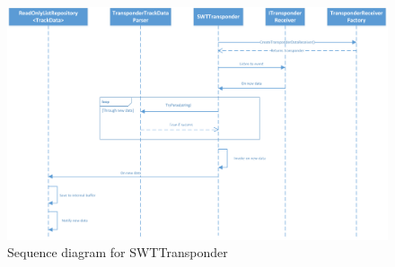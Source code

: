 \begin{figure}
\centering
\includegraphics[width=1.0\linewidth]{Images/SWTTransponder}
\caption{Sequence diagram for SWTTransponder}
\label{fig:SWTTransponder}
\end{figure}


\clearpage
